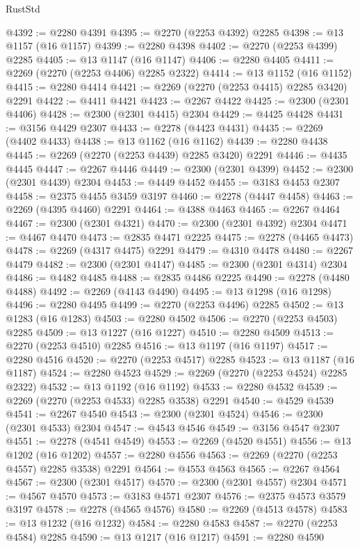 \begin{lexlean}{RustStd}
\begin{coremodule}
@4392 := @2280 @4391
@4395 := @2270 (@2253 @4392) @2285
@4398 := @13 @1157 (@16 @1157)
@4399 := @2280 @4398
@4402 := @2270 (@2253 @4399) @2285
@4405 := @13 @1147 (@16 @1147)
@4406 := @2280 @4405
@4411 := @2269 (@2270 (@2253 @4406) @2285 @2322)
@4414 := @13 @1152 (@16 @1152)
@4415 := @2280 @4414
@4421 := @2269 (@2270 (@2253 @4415) @2285 @3420) @2291
@4422 := @4411 @4421
@4423 := @2267 @4422
@4425 := @2300 (@2301 @4406)
@4428 := @2300 (@2301 @4415) @2304
@4429 := @4425 @4428
@4431 := @3156 @4429 @2307
@4433 := @2278 (@4423 @4431)
@4435 := @2269 (@4402 @4433)
@4438 := @13 @1162 (@16 @1162)
@4439 := @2280 @4438
@4445 := @2269 (@2270 (@2253 @4439) @2285 @3420) @2291
@4446 := @4435 @4445
@4447 := @2267 @4446
@4449 := @2300 (@2301 @4399)
@4452 := @2300 (@2301 @4439) @2304
@4453 := @4449 @4452
@4455 := @3183 @4453 @2307
@4458 := @2375 @4455 @3459 @3197
@4460 := @2278 (@4447 @4458)
@4463 := @2269 (@4395 @4460) @2291
@4464 := @4388 @4463
@4465 := @2267 @4464
@4467 := @2300 (@2301 @4321)
@4470 := @2300 (@2301 @4392) @2304
@4471 := @4467 @4470
@4473 := @2835 @4471 @2225
@4475 := @2278 (@4465 @4473)
@4478 := @2269 (@4317 @4475) @2291
@4479 := @4310 @4478
@4480 := @2267 @4479
@4482 := @2300 (@2301 @4147)
@4485 := @2300 (@2301 @4314) @2304
@4486 := @4482 @4485
@4488 := @2835 @4486 @2225
@4490 := @2278 (@4480 @4488)
@4492 := @2269 (@4143 @4490)
@4495 := @13 @1298 (@16 @1298)
@4496 := @2280 @4495
@4499 := @2270 (@2253 @4496) @2285
@4502 := @13 @1283 (@16 @1283)
@4503 := @2280 @4502
@4506 := @2270 (@2253 @4503) @2285
@4509 := @13 @1227 (@16 @1227)
@4510 := @2280 @4509
@4513 := @2270 (@2253 @4510) @2285
@4516 := @13 @1197 (@16 @1197)
@4517 := @2280 @4516
@4520 := @2270 (@2253 @4517) @2285
@4523 := @13 @1187 (@16 @1187)
@4524 := @2280 @4523
@4529 := @2269 (@2270 (@2253 @4524) @2285 @2322)
@4532 := @13 @1192 (@16 @1192)
@4533 := @2280 @4532
@4539 := @2269 (@2270 (@2253 @4533) @2285 @3538) @2291
@4540 := @4529 @4539
@4541 := @2267 @4540
@4543 := @2300 (@2301 @4524)
@4546 := @2300 (@2301 @4533) @2304
@4547 := @4543 @4546
@4549 := @3156 @4547 @2307
@4551 := @2278 (@4541 @4549)
@4553 := @2269 (@4520 @4551)
@4556 := @13 @1202 (@16 @1202)
@4557 := @2280 @4556
@4563 := @2269 (@2270 (@2253 @4557) @2285 @3538) @2291
@4564 := @4553 @4563
@4565 := @2267 @4564
@4567 := @2300 (@2301 @4517)
@4570 := @2300 (@2301 @4557) @2304
@4571 := @4567 @4570
@4573 := @3183 @4571 @2307
@4576 := @2375 @4573 @3579 @3197
@4578 := @2278 (@4565 @4576)
@4580 := @2269 (@4513 @4578)
@4583 := @13 @1232 (@16 @1232)
@4584 := @2280 @4583
@4587 := @2270 (@2253 @4584) @2285
@4590 := @13 @1217 (@16 @1217)
@4591 := @2280 @4590

\end{coremodule}
\end{lexlean}
